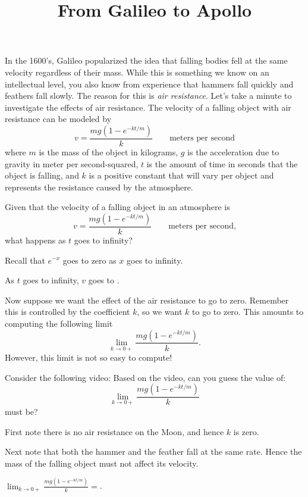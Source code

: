 \documentclass{ximera}
\title[Break-Ground:]{From Galileo to Apollo}
\begin{document}
\begin{abstract}

\end{abstract}
\maketitle


In the 1600's, Galileo popularized the idea that falling bodies fell
at the same velocity regardless of their mass. While this is something
we know on an intellectual level, you also know from experience that
hammers fall quickly and feathers fall slowly. The reason for this is
\textit{air resistance}.  Let's take a minute to investigate the
effects of air resistance. The velocity of a falling object with air
resistance can be modeled by
\[
v = \frac{mg(1-e^{-kt/m})}{k}\qquad\text{meters per second}
\]
where $m$ is the mass of the object in kilograms, $g$ is the
acceleration due to gravity in meter per second-squared, $t$ is the
amount of time in seconds that the object is falling, and $k$ is a
positive constant that will vary per object and represents the
resistance caused by the atmosphere.

\begin{problem}
Given that the velocity of a falling object in an atmosphere is 
\[
v = \frac{mg(1-e^{-kt/m})}{k}\qquad\text{meters per second,}
\]
what happens as $t$ goes to infinity?
\begin{hint}
Recall that $e^{-x}$ goes to zero as $x$ goes to infinity.
\end{hint}
\begin{prompt}
As $t$ goes to infinity, $v$ goes to .
\end{prompt}
\end{problem}


Now suppose we want the effect of the air resistance to go to
zero. Remember this is controlled by the coefficient $k$, so we want
$k$ to go to zero. This amounts to computing the following limit
\[
\lim_{k\to 0+} \frac{mg(1-e^{-kt/m})}{k}.
\]
However, this limit is not so easy to compute!

\begin{problem}
Consider the following video: 
Based on the video, can you guess the value of:
\[
\lim_{k\to 0+} \frac{mg(1-e^{-kt/m})}{k}
\]
must be?
\begin{hint}
First note there is no air resistance on the Moon, and hence $k$ is
zero.
\end{hint}
\begin{hint}
Next note that both the hammer and the feather fall at the same rate.
Hence the mass of the falling object must not affect its velocity.
\end{hint}
\begin{prompt}
$\lim_{k\to 0+}\frac{mg(1-e^{-kt/m})}{k} = $.
\end{prompt}
\end{problem}
\end{document}
